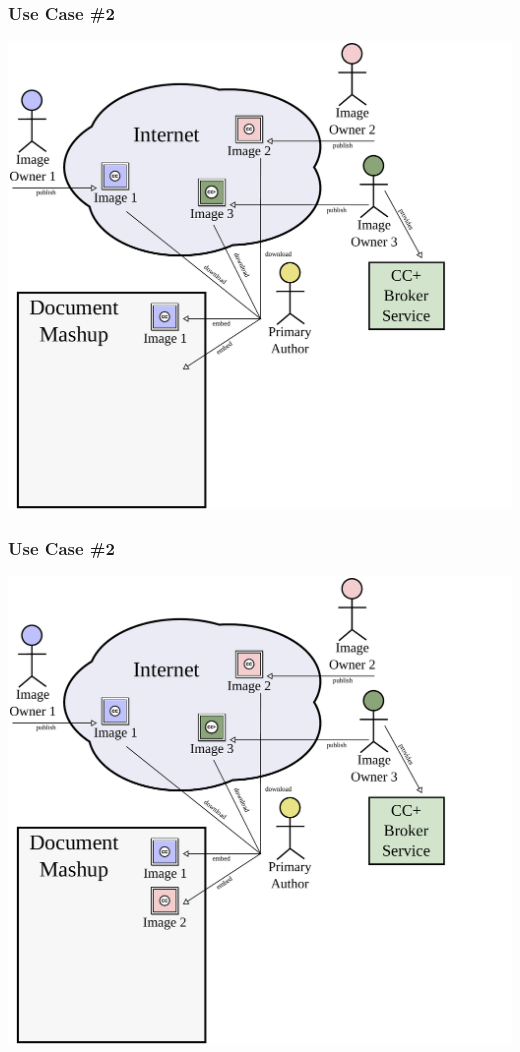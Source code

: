 \documentclass[mathserif,xcolor=dvipsnames,hyperref={bookmarks=true}]{beamer}
\begin{document}
    \begin{frame}[t]
        \frametitle{Use Case \#2}
        \begin{center}
            \includegraphics[width=0.9\textheight]{../resources/usecases/usecase2/usecase2-step20.pdf}
        \end{center}
    \end{frame}
    \begin{frame}[t]
        \frametitle{Use Case \#2}
        \begin{center}
            \includegraphics[width=0.9\textheight]{../resources/usecases/usecase2/usecase2-step21.pdf}
        \end{center}
    \end{frame}
\end{document}
